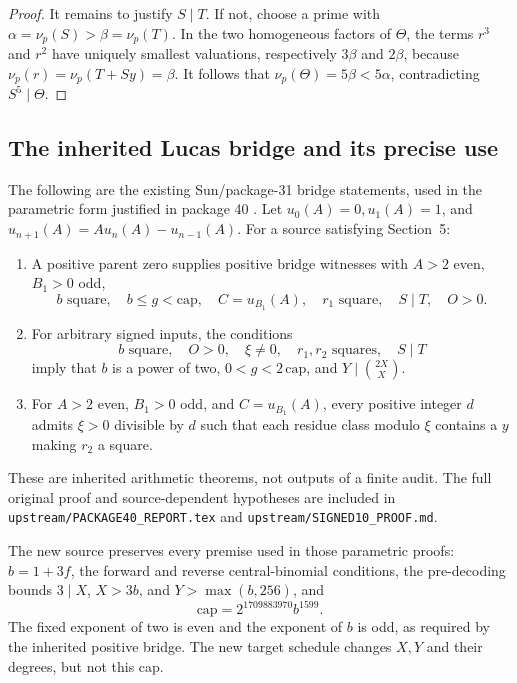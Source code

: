 \documentclass[11pt,letterpaper]{article}
\theoremstyle{remark}\newtheorem{remark}[theorem]{Remark}
\newcommand{\file}[1]{\nolinkurl{#1}}
\begin{document}
\begin{proof}
It remains to justify $S\mid T$. If not, choose a prime with
$\alpha=\nu_p(S)>\beta=\nu_p(T)$. In the two homogeneous factors
of $\Theta$, the terms $r^3$ and $r^2$ have uniquely smallest valuations,
respectively $3\beta$ and $2\beta$, because
$\nu_p(r)=\nu_p(T+Sy)=\beta$.
It follows that $\nu_p(\Theta)=5\beta<5\alpha$,
contradicting $S^5\mid\Theta$.
\end{proof}

\subsection{The inherited Lucas bridge and its precise use}
The following are the existing Sun/package-31 bridge statements, used
in the parametric form justified in package 40 \cite{repo40,sun2026}.
Let $u_0(A)=0,u_1(A)=1$, and
$u_{n+1}(A)=Au_n(A)-u_{n-1}(A)$.
For a source satisfying Section~5:
\begin{enumerate}
\item A positive parent zero supplies positive bridge witnesses with
$A>2$ even, $B_1>0$ odd,
\[
 b\text{ square},\quad b\le g<\mathrm{cap},\quad
 C=u_{B_1}(A),\quad r_1\text{ square},\quad S\mid T,\quad O>0.
\]
\item For arbitrary signed inputs, the conditions
\[
 b\text{ square},\quad O>0,\quad \xi\ne0,\quad
 r_1,r_2\text{ squares},\quad S\mid T
\]
imply that $b$ is a power of two, $0<g<2\,\mathrm{cap}$, and
$Y\mid\binom{2X}{X}$.
\item For $A>2$ even, $B_1>0$ odd, and $C=u_{B_1}(A)$, every positive
integer $d$ admits $\xi>0$ divisible by $d$ such that each residue class
modulo $\xi$ contains a $y$ making $r_2$ a square.
\end{enumerate}
These are inherited arithmetic theorems, not outputs of a finite audit.
The full original proof and source-dependent hypotheses are included in
\file{upstream/PACKAGE40_REPORT.tex} and
\file{upstream/SIGNED10_PROOF.md}.

The new source preserves every premise used in those parametric proofs:
$b=1+3f$, the forward and reverse central-binomial conditions, the
pre-decoding bounds $3\mid X$, $X>3b$, and $Y>\max(b,256)$, and
\[
 \mathrm{cap}=2^{1709883970}b^{1599}.
\]
The fixed exponent of two is even and the exponent of $b$ is odd,
as required by the inherited positive bridge. The new target schedule
changes $X,Y$ and their degrees, but not this cap.
\end{document}
